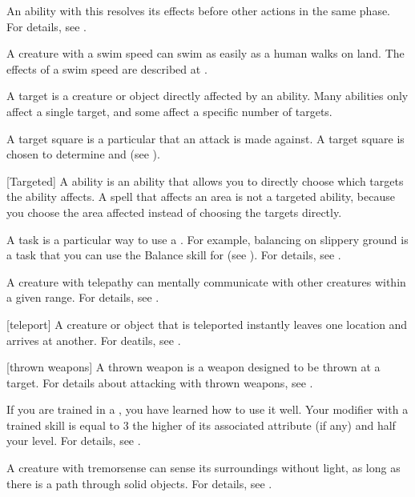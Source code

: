  An ability with this  resolves its effects before other actions in the same phase.
For details, see .

 A creature with a swim speed can swim as easily as a human walks on land.
The effects of a swim speed are described at .

 A target is a creature or object directly affected by an ability.
Many abilities only affect a single target, and some affect a specific number of targets.

 A target square is a particular  that an attack is made against.
A target square is chosen to determine  and  (see ).

[Targeted] A  ability is an ability that allows you to directly choose which targets the ability affects.
A spell that affects an area is not a targeted ability, because you choose the area affected instead of choosing the targets directly.

 A task is a particular way to use a .
For example, balancing on slippery ground is a task that you can use the Balance skill for (see ).
For details, see .

 A creature with telepathy can mentally communicate with other creatures within a given range.
For details, see .

[teleport] A creature or object that is teleported instantly leaves one location and arrives at another.
For deatils, see .

[thrown weapons] A thrown weapon is a weapon designed to be thrown at a target.
For details about attacking with thrown weapons, see .

 If you are trained in a , you have learned how to use it well.
Your modifier with a trained skill is equal to 3 \add the higher of its associated attribute (if any) and half your level.
For details, see .

 A creature with tremorsense can sense its surroundings without light, as long as there is a path through solid objects.
For details, see .

